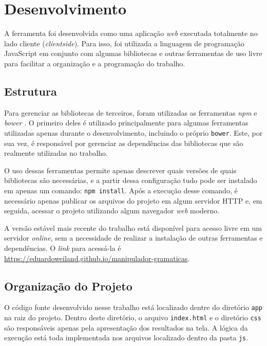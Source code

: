 \documentclass[12pt]{article}
\begin{document}
\section{Desenvolvimento}

A ferramenta foi desenvolvida como uma aplicação \textit{web} executada totalmente no lado cliente (\textit{clientside}).
Para isso, foi utilizada a linguagem de programação JavaScript em conjunto com algumas bibliotecas e outras ferramentas
de uso livre para facilitar a organização e a programação do trabalho.

\subsection{Estrutura}

Para gerenciar as bibliotecas de terceiros, foram utilizadas as ferramentas \textit{npm} \cite{npm} e \textit{bower}
\cite{bower}. O primeiro deles é utilizado principalmente para algumas ferramentas utilizadas apenas durante o
desenvolvimento, incluindo o próprio \texttt{bower}. Este, por sua vez, é responsável por gerenciar as dependências
das bibliotecas que são realmente utilizadas no trabalho.

O uso dessas ferramentas permite apenas descrever quais versões de quais bibliotecas são necessárias, e a partir dessa
configuração tudo pode ser instalado em apenas um comando: \texttt{npm install}. Após a execução desse comando, é
necessário apenas publicar os arquivos do projeto em algum servidor HTTP e, em seguida, acessar o projeto utilizando
algum navegador \textit{web} moderno.

A versão estável mais recente do trabalho está disponível para acesso livre em um servidor \textit{online}, sem a
necessidade de realizar a instalação de outras ferramentas e dependências. O \textit{link} para acessá-la é
\href{https://eduardoweiland.github.io/manipulador-gramaticas}{https://eduardoweiland.github.io/manipulador-gramaticas}.

\subsection{Organização do Projeto}

O código fonte desenvolvido nesse trabalho está localizado dentre do diretório \texttt{app} na raiz do projeto. Dentro
deste diretório, o arquivo \texttt{index.html} e o diretório \texttt{css} são responsáveis apenas pela apresentação dos
resultados na tela. A lógica da execução está toda implementada nos arquivos localizado dentro da pasta \texttt{js}.
\end{document}
